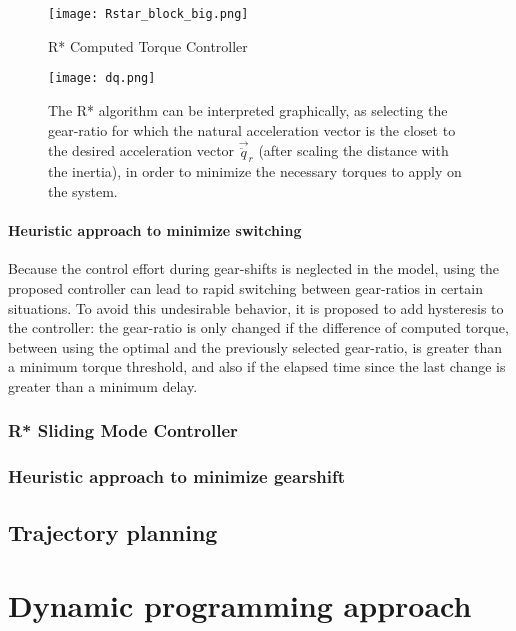\begin{figure*}[t]
	\centering
		\texttt{[image: Rstar\_block\_big.png]}
	\caption{R* Computed Torque Controller}
	\label{fig:bbb}
\end{figure*}

\begin{figure}[htp]
	\centering
		\texttt{[image: dq.png]}
	\caption{The R* algorithm can be interpreted graphically, as selecting the gear-ratio for which the natural acceleration vector is the closet to the desired acceleration vector $\vec{\ddot{q}}_r$ (after scaling the distance with the inertia), in order to minimize the necessary torques to apply on the system.}
	\label{fig:dq}
\end{figure}


\paragraph{Heuristic approach to minimize switching}

Because the control effort during gear-shifts is neglected in the model, using the proposed controller can lead to rapid switching between gear-ratios in certain situations. To avoid this undesirable behavior, it is proposed to add hysteresis to the controller: the gear-ratio is only changed if the difference of computed torque, between using the optimal and the previously selected gear-ratio, is greater than a minimum torque threshold, and also if the elapsed time since the last change is greater than a minimum delay. 

\subsubsection{R* Sliding Mode Controller}

\subsubsection{Heuristic approach to minimize gearshift}


\subsection{Trajectory planning}
\label{sec:SamplingBasedTrajectoryPlanner}


\section{Dynamic programming approach}
\label{sec:DynamicProgrammingAproach}



